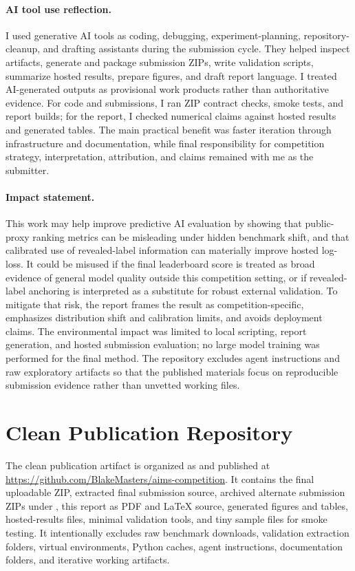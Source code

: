 \documentclass[11pt]{article}
\begin{document}
\paragraph{AI tool use reflection.}
I used generative AI tools as coding, debugging, experiment-planning, repository-cleanup, and drafting assistants during the submission cycle. They helped inspect artifacts, generate and package submission ZIPs, write validation scripts, summarize hosted results, prepare figures, and draft report language. I treated AI-generated outputs as provisional work products rather than authoritative evidence. For code and submissions, I ran ZIP contract checks, smoke tests, and report builds; for the report, I checked numerical claims against hosted results and generated tables. The main practical benefit was faster iteration through infrastructure and documentation, while final responsibility for competition strategy, interpretation, attribution, and claims remained with me as the submitter.

\paragraph{Impact statement.}
This work may help improve predictive AI evaluation by showing that public-proxy ranking metrics can be misleading under hidden benchmark shift, and that calibrated use of revealed-label information can materially improve hosted log-loss. It could be misused if the final leaderboard score is treated as broad evidence of general model quality outside this competition setting, or if revealed-label anchoring is interpreted as a substitute for robust external validation. To mitigate that risk, the report frames the result as competition-specific, emphasizes distribution shift and calibration limits, and avoids deployment claims. The environmental impact was limited to local scripting, report generation, and hosted submission evaluation; no large model training was performed for the final method. The repository excludes agent instructions and raw exploratory artifacts so that the published materials focus on reproducible submission evidence rather than unvetted working files.

\section{Clean Publication Repository}
The clean publication artifact is organized as  and published at \url{https://github.com/BlakeMasters/aims-competition}. It contains the final uploadable ZIP, extracted final submission source, archived alternate submission ZIPs under , this report as PDF and LaTeX source, generated figures and tables, hosted-results files, minimal validation tools, and tiny sample files for smoke testing. It intentionally excludes raw benchmark downloads, validation extraction folders, virtual environments, Python caches, agent instructions, documentation folders, and iterative working artifacts.
\end{document}
